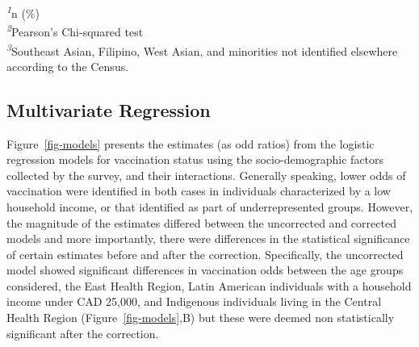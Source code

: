 \documentclass[
]{article}
\begin{document}
\begin{minipage}{\linewidth}
\textsuperscript{\textit{1}}n (\%)\\
\textsuperscript{\textit{2}}Pearson's Chi-squared test\\
\textsuperscript{\textit{3}}Southeast Asian, Filipino, West Asian,
and minorities not identified elsewhere according to the Census.\\
\end{minipage}

\hypertarget{multivariate-regression}{%
\subsection{Multivariate Regression}\label{multivariate-regression}}

Figure~\ref{fig-models} presents the estimates (as odd ratios) from the
logistic regression models for vaccination status using the
socio-demographic factors collected by the survey, and their
interactions. Generally speaking, lower odds of vaccination were
identified in both cases in individuals characterized by a low household
income, or that identified as part of underrepresented groups. However,
the magnitude of the estimates differed between the uncorrected and
corrected models and more importantly, there were differences in the
statistical significance of certain estimates before and after the
correction. Specifically, the uncorrected model showed significant
differences in vaccination odds between the age groups considered, the
East Health Region, Latin American individuals with a household income
under CAD 25,000, and Indigenous individuals living in the Central
Health Region (Figure~\ref{fig-models},B) but these were deemed non
statistically significant after the correction.
\end{document}
